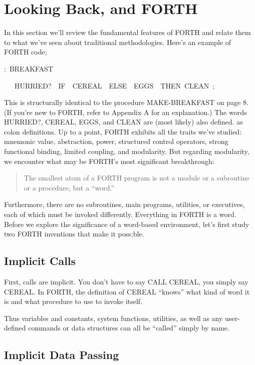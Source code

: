 \section*{Looking Back, and FORTH}

In this section we'll review the fundamental features of FORTH and
relate them to what we've seen about traditional methodologies. Here's
an example of FORTH code;

\begin{lyxcode}
:~BREAKFAST

~~~HURRIED?~~IF~~CEREAL~~ELSE~~EGGS~~THEN~CLEAN~;
\end{lyxcode}
This is structurally identical to the procedure MAKE-BREAKFAST on
page 8. (If you're new to FORTH, refer to Appendix A for an explanation.)
The words HURRIED?, CEREAL, EGGS, and CLEAN are (most likely) also
defined. as colon definitions. Up to a point, FORTH exhibits all the
traits we've studied: mnemonic value, abstraction, power, structured
control operators, strong functional binding, limited coupling, and
modularity. But regarding modularity, we encounter what may be FORTH's
most significant breakthrough:

\begin{quote}
The smallest atom of a FORTH program is not a module or a subroutine
or a procedure, but a {}``word.''
\end{quote}
Furthermore, there are no subroutines, main programs, utilities, or
executives, each of which must be invoked differently. Everything
in FORTH is a word. Before we explore the significance of a word-based
environment, let's first study two FORTH inventions that make it poss;ble.


\subsection*{Implicit Calls}

First, calls are implicit. You don't have to say CALL CEREAL, you
simply say CEREAL. In FORTH, the definition of CEREAL {}``knows''
what kind of word it is and what procedure to use to invoke itself.

Thus variables and constants, system functions, utilities, as well
as any user-defined commands or data structures can all be {}``called''
simply by name.


\subsection*{Implicit Data Passing}

